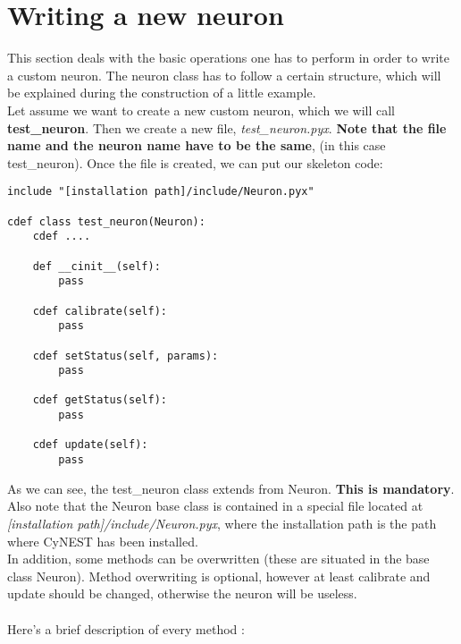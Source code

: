 \documentclass{article}
\begin{document}
\section{Writing a new neuron}
This section deals with the basic operations one has to perform in order to write a custom neuron. The neuron class has to follow a certain structure, which will be explained during the construction of a little example. \\
Let assume we want to create a new custom neuron, which we will call \textbf{test\_neuron}. Then we create a new file, \emph{test\_neuron.pyx}. \textbf{Note that the file name and the neuron name have to be the same}, (in this case test\_neuron). Once the file is created, we can put our skeleton code:
\begin{verbatim}
include "[installation path]/include/Neuron.pyx"

cdef class test_neuron(Neuron):
    cdef ....
    
    def __cinit__(self):
        pass

    cdef calibrate(self):
        pass

    cdef setStatus(self, params):
        pass

    cdef getStatus(self):
        pass

    cdef update(self):
        pass
\end{verbatim}
As we can see, the test\_neuron class extends from Neuron. \textbf{This is mandatory}. Also note that the Neuron base class is contained in a special file located at \emph{[installation path]/include/Neuron.pyx}, where the installation path is the path where CyNEST has been installed.\\
In addition, some methods can be overwritten (these are situated in the base class Neuron). Method overwriting is optional, however at least calibrate and update should be changed, otherwise the neuron will be useless.\\ \\
Here's a brief description of every method :
\end{document}
